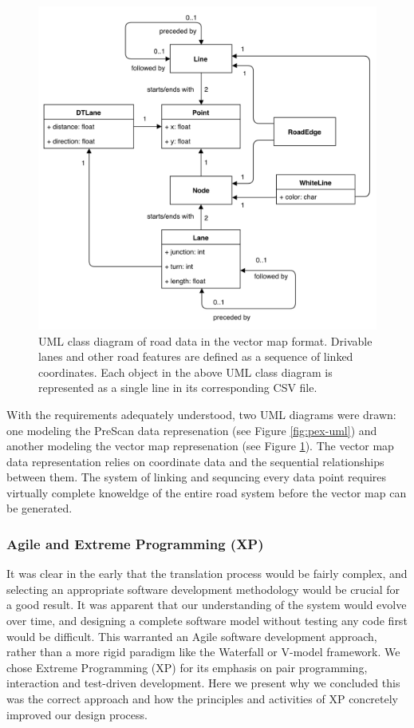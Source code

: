 \documentclass[12pt,twoside]{article}
\begin{document}
\begin{figure}[ht]
    \centering
    \includegraphics[width=12cm,keepaspectratio]{vmap-uml.png}
    \caption{UML class diagram of road data in the vector map format. Drivable lanes and other road features are defined as a sequence of linked coordinates. Each object in the above UML class diagram is represented as a single line in its corresponding CSV file.}
    \label{fig:vmap-uml}
\end{figure}

With the requirements adequately understood, two UML diagrams were drawn: one modeling the PreScan data represenation (see Figure \ref{fig:pex-uml}) and another modeling the vector map represenation (see Figure \ref{fig:vmap-uml}). The vector map data representation relies on coordinate data and the sequential relationships between them. The system of linking and sequncing every data point requires virtually complete knoweldge of the entire road system before the vector map can be generated.

\subsubsection{Agile and Extreme Programming (XP)}

It was clear in the early that the translation process would be fairly complex, and selecting an appropriate software development methodology would be crucial for a good result. It was apparent that our understanding of the system would evolve over time, and designing a complete software model without testing any code first would be difficult. This warranted an Agile software development approach, rather than a more rigid paradigm like the Waterfall or V-model framework. We chose Extreme Programming (XP) for its emphasis on pair programming, interaction and test-driven development. Here we present why we concluded this was the correct approach and how the principles and activities of XP concretely improved our design process.
\end{document}
